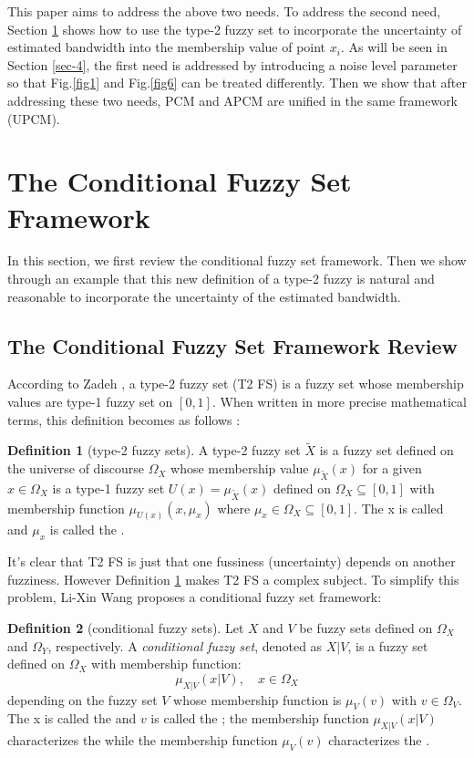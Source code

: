 \documentclass[journal]{IEEEtran}
\theoremstyle{definition}
\newtheorem{definition}{Definition}
\begin{document}
This paper aims to address the above two needs. 
To address the second need, Section \ref{sec-3} shows how to use the type-2 fuzzy set to incorporate the uncertainty of estimated bandwidth into the membership value of point $x_i$. As will be seen in Section \ref{sec-4}, the first need is addressed by introducing a noise level parameter so that Fig.\ref{fig1} and Fig.\ref{fig6} can be treated differently. Then we show that after addressing these two needs, PCM and APCM are unified in the same framework (UPCM).
\section{The Conditional Fuzzy Set Framework}
\label{sec-3}
In this section, we first review the conditional fuzzy set framework. Then we show through an example that this new definition of a type-2 fuzzy is natural and reasonable to incorporate the uncertainty of the estimated bandwidth.
\subsection{The Conditional Fuzzy Set Framework Review}
\label{sec-3-1}
According to Zadeh \cite{zadeh_concept_1975}, a type-2 fuzzy set (T2 FS) is a fuzzy set whose membership values are type-1 fuzzy set on $[0,1]$. When written in more precise mathematical terms,  this definition becomes as follows \cite{wang_new_2016}:

\begin{definition}[type-2 fuzzy sets]
\label{type2-fs}
A type-2 fuzzy set $\tilde{X}$ is a fuzzy set defined on the universe of discourse $\Omega_X$ whose membership value $\mu_\tilde{X}(x)$ for a given $x\in\Omega_X$ is a type-1 fuzzy set  $U(x)=\mu_\tilde{X}(x)$ defined on $\Omega_X\subseteq[0,1]$ with membership function $\mu_{U(x)}(x,\mu_x)$ where $\mu_x\in\Omega_X\subseteq[0,1]$. The x is called  and $\mu_x$ is called the .
\end{definition}

It's clear that T2 FS is just that one fussiness (uncertainty) depends on another fuzziness. However Definition \ref{type2-fs} makes T2 FS a complex subject. To simplify this problem, Li-Xin Wang \cite{wang_new_2016} proposes a conditional fuzzy set framework:

\begin{definition}[conditional fuzzy sets]
\label{conditional-fs}
Let $X$ and $V$ be fuzzy sets defined on $\Omega_X$ and $\Omega_Y$, respectively. A \emph{conditional fuzzy set}, denoted as $X|V$, is a fuzzy set defined on $\Omega_X$ with membership function:
\begin{equation}
\mu_{X|V}(x|V),\quad  x\in\Omega_X
\end{equation}
depending on the fuzzy set $V$ whose membership function is $\mu_V(v)$ with $v\in\Omega_V$. The x is called the  and $v$ is called the ; the membership function $\mu_{X|V}(x|V)$ characterizes the  while the membership function $\mu_V(v)$ characterizes the .
\end{definition}
\end{document}
